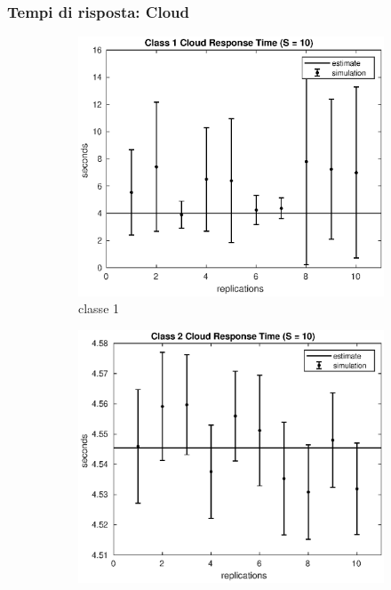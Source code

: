 \subsubsection{Tempi di risposta: Cloud}
%
\begin{figure}[!h]
\centering
%
\begin{subfigure}[t]{0.49\textwidth}
\includegraphics[width=\textwidth]{figures/simul/10_500K_s1cloud}
\caption{classe 1}
\label{10_s1cloud}
\end{subfigure}
%
\begin{subfigure}[t]{0.49\textwidth}
\includegraphics[width=\textwidth]{figures/simul/10_500K_s2cloud}

\end{subfigure}
\end{figure}
